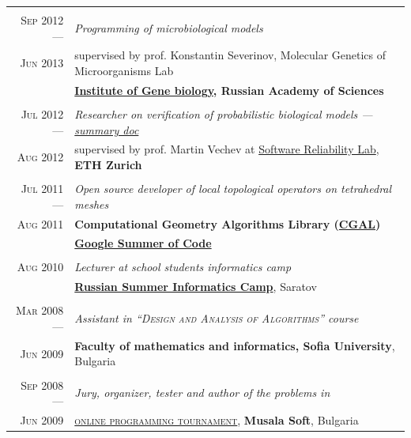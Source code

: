 \documentclass[a4paper,10pt]{article}
\def\myline{\color{linegray}\vline}
\begin{document}
{\begin{tabular}{r!{\myline}p{14cm}}
        \\
	\textsc{Sep 2012 ---}      &  \textit{Programming of microbiological models}\\
        \textsc{Jun 2013}  &  supervised by prof. Konstantin Severinov, Molecular Genetics of Microorganisms Lab\\
                                  &  \textbf{\href{http://www.genebiology.ru/}{Institute of Gene biology}, Russian Academy of Sciences}\\
	
        \\
	\textsc{Jul 2012 ---}      &  \textit{Researcher on verification of probabilistic biological models --- \href{https://docs.google.com/document/d/1tNkXLaWY3ooA4MEnrbrL2_DOpOaiTlLoFblwzKFZdy0/edit?usp=sharing}{summary doc}}\\
        \textsc{Aug 2012} &  supervised by prof. Martin Vechev at \href{http://www.srl.inf.ethz.ch/}{Software Reliability Lab}, \textbf{ETH Zurich}\\
	
        \\
	\textsc{Jul 2011 ---}      &  \textit{Open source developer of local topological operators on tetrahedral meshes}\\
        \textsc{Aug 2011}         &  \textbf{Computational Geometry Algorithms Library (\href{http://www.cgal.org/}{CGAL})}\\
                                  &  \textbf{\href{http://code.google.com/soc/}{Google Summer of Code} }\\
	
        \\
	\textsc{Aug 2010}         &  \textit{Lecturer at school students informatics camp}\\
	                          &  \textbf{\href{http://lksh.ru/}{Russian Summer Informatics Camp}}, Saratov\vspace{-5mm}\\
	
	\\
	\textsc{Mar 2008 ---}      &  \textit{Assistant in \textsc{``Design and Analysis of Algorithms''} course}\\
	\textsc{Jun 2009}        &  \textbf{Faculty of mathematics and informatics, Sofia University}, Bulgaria\\

	\\
	\textsc{Sep 2008 ---}     &  \textit{Jury, organizer, tester and \textit{author} of the problems in}\\
	\textsc{Jun 2009}        &  \textsc{\href{http://konkurs.musala.com/}{online programming tournament}}, \textbf{Musala Soft}, Bulgaria\\


\end{tabular}}
\end{document}
